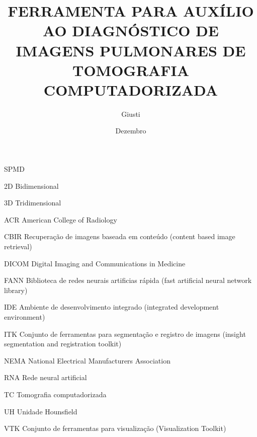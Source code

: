 \documentclass[tc]{texufpel}
\author{Giusti}{Filipe Vernetti}
\title{FERRAMENTA PARA AUXÍLIO AO DIAGNÓSTICO DE IMAGENS PULMONARES DE TOMOGRAFIA COMPUTADORIZADA}
\date{Dezembro}{2008}
\begin{document}
\maketitle

\makeexaminers




\listoffigures
\listoftables

\begin{listofabbrv}{SPMD}
	\item[2D] Bidimensional
	\item[3D] Tridimensional
	\item[ACR] American College of Radiology
	\item[CBIR] Recuperação de imagens baseada em conteúdo (content based image retrieval)
	\item[DICOM] Digital Imaging and Communications in Medicine
	\item[FANN] Biblioteca de redes neurais artificias rápida (fast artificial neural network library)
	\item[IDE] Ambiente de desenvolvimento integrado (integrated development environment)
	\item[ITK] Conjunto de  ferramentas para segmentação e registro de imagens (insight segmentation and registration toolkit)
	\item[NEMA] National Electrical Manufacturers Association
	\item[RNA] Rede neural artificial
	\item[TC] Tomografia computadorizada
	\item[UH] Unidade Hounsfield
	\item[VTK] Conjunto de ferramentas para visualização (Visualization Toolkit)
\end{listofabbrv}


\tableofcontents










\end{document}
